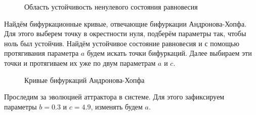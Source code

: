 \documentclass[12pt, a4paper]{article}
\begin{document}
\begin{figure}[H]
	\caption{Область устойчивость ненулевого состояния равновесия}
\end{figure}

Найдём бифуркационные кривые, отвечающие бифуркации Андронова-Хопфа. Для этого выберем точку в окрестности нуля, подберём параметры так, чтобы ноль был устойчив. Найдём устойчивое состояние равновесия и с помощью протягивания параметра $a$ будем искать точки бифуркаций. Далее выбираем эти точки и протягиваем их уже по двум параметрам $a$ и $c$.

\begin{figure}[H]
	\caption{Кривые бифуркаций Андронова-Хопфа}
\end{figure}

Проследим за эволюцией аттрактора в системе. Для этого зафиксируем параметры $b = 0.3$ и $c = 4.9$, изменять будем $a$.
\end{document}
